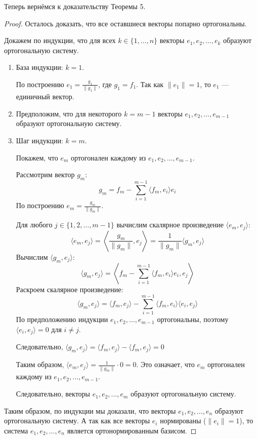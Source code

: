 Теперь вернёмся к доказательству Теоремы 5.
\begin{proof}

Осталось доказать, что все оставшиеся векторы попарно ортогональны.

Докажем по индукции, что для всех \( k \in \{1, \ldots, n\} \) векторы \( e_1, e_2, \ldots, e_k \) образуют ортогональную систему.

\begin{enumerate}
    \item База индукции: \( k = 1 \).

    По построению \( e_1 = \frac{g_1}{\|g_1\|} \), где \(g_1 = f_1\). Так как \(\|e_1\| = 1\), то \( e_1 \) — единичный вектор.

    \item Предположим, что для некоторого \( k = m-1 \) векторы \( e_1, e_2, \ldots, e_{m-1} \) образуют ортогональную систему.

    \item Шаг индукции: \( k = m \).

    Покажем, что \( e_m \) ортогонален каждому из \( e_1, e_2, \ldots, e_{m-1} \).

    Рассмотрим вектор \( g_m \):
    \[
    g_m = f_m - \sum_{i=1}^{m-1} \langle f_m, e_i \rangle e_i
    \]
    По построению \( e_m = \frac{g_m}{\|g_m\|} \).

    Для любого \( j \in \{1, 2, \ldots, m-1\} \) вычислим скалярное произведение \( \langle e_m, e_j \rangle \):
    \[
    \langle e_m, e_j \rangle = \left\langle \frac{g_m}{\|g_m\|}, e_j \right\rangle = \frac{1}{\|g_m\|} \langle g_m, e_j \rangle
    \]
    Вычислим \( \langle g_m, e_j \rangle \):
    \[
    \langle g_m, e_j \rangle = \left\langle f_m - \sum_{i=1}^{m-1} \langle f_m, e_i \rangle e_i, e_j \right\rangle
    \]
    Раскроем скалярное произведение:
    \[
    \langle g_m, e_j \rangle = \langle f_m, e_j \rangle - \sum_{i=1}^{m-1} \langle f_m, e_i \rangle \langle e_i, e_j \rangle
    \]
    По предположению индукции \( e_1, e_2, \ldots, e_{m-1} \) ортогональны, поэтому \newline \( \langle e_i, e_j \rangle = 0 \) для \( i \neq j \).
    \nl 
    
    Следовательно,  $
    \langle g_m, e_j \rangle = \langle f_m, e_j \rangle - \langle f_m, e_j \rangle = 0 $
    \nl 
    
    
    Таким образом, $\langle e_m, e_j \rangle = \frac{1}{\|g_m\|} \cdot 0 = 0$. 
    Это означает, что \( e_m \) ортогонален каждому из \( e_1, e_2, \ldots, e_{m-1} \).
    \nl 

    Следовательно, векторы \( e_1, e_2, \ldots, e_m \) образуют ортогональную систему.
\end{enumerate}

\vspace{0.4cm}

Таким образом, по индукции мы доказали, что векторы \( e_1, e_2, \ldots, e_n \) образуют ортогональную систему. А так как все векторы \( e_i \) нормированы (\(\|e_i\| = 1\)), то система \( e_1, e_2, \ldots, e_n \) является ортонормированным базисом.

\end{proof}

